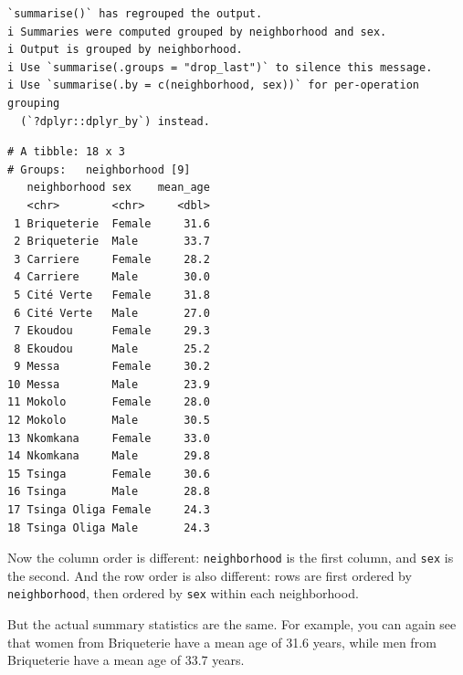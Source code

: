 \documentclass[
  letterpaper,
  DIV=11,
  numbers=noendperiod]{scrreprt}
\begin{document}
\begin{verbatim}
`summarise()` has regrouped the output.
i Summaries were computed grouped by neighborhood and sex.
i Output is grouped by neighborhood.
i Use `summarise(.groups = "drop_last")` to silence this message.
i Use `summarise(.by = c(neighborhood, sex))` for per-operation grouping
  (`?dplyr::dplyr_by`) instead.
\end{verbatim}

\begin{verbatim}
# A tibble: 18 x 3
# Groups:   neighborhood [9]
   neighborhood sex    mean_age
   <chr>        <chr>     <dbl>
 1 Briqueterie  Female     31.6
 2 Briqueterie  Male       33.7
 3 Carriere     Female     28.2
 4 Carriere     Male       30.0
 5 Cité Verte   Female     31.8
 6 Cité Verte   Male       27.0
 7 Ekoudou      Female     29.3
 8 Ekoudou      Male       25.2
 9 Messa        Female     30.2
10 Messa        Male       23.9
11 Mokolo       Female     28.0
12 Mokolo       Male       30.5
13 Nkomkana     Female     33.0
14 Nkomkana     Male       29.8
15 Tsinga       Female     30.6
16 Tsinga       Male       28.8
17 Tsinga Oliga Female     24.3
18 Tsinga Oliga Male       24.3
\end{verbatim}

Now the column order is different: \texttt{neighborhood} is the first
column, and \texttt{sex} is the second. And the row order is also
different: rows are first ordered by \texttt{neighborhood}, then ordered
by \texttt{sex} within each neighborhood.

But the actual summary statistics are the same. For example, you can
again see that women from Briqueterie have a mean age of 31.6 years,
while men from Briqueterie have a mean age of 33.7 years.
\end{document}

